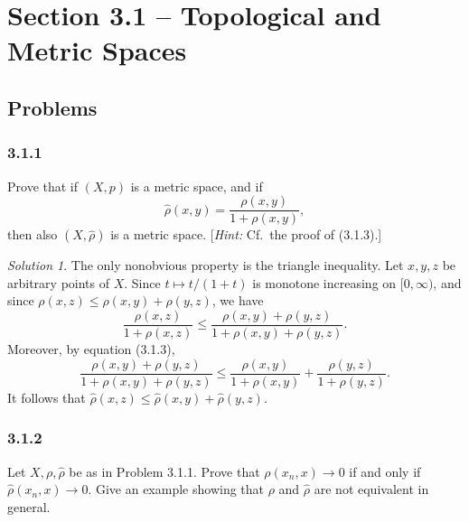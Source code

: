 \documentclass{report}
\theoremstyle{remark}
\newtheorem*{solution}{Solution}
\begin{document}
\section*{Section 3.1 -- Topological and Metric Spaces}

\subsection*{Problems}

\subsubsection*{3.1.1}
Prove that if $(X,p)$ is a metric space, and if
\begin{equation*}
  \hat \rho(x,y) = \frac{\rho(x,y)}{1 + \rho(x,y)},
\end{equation*}
then also $(X,\hat \rho)$ is a metric space. [\emph{Hint:} Cf.\ the proof of (3.1.3).]

\begin{solution}
  The only nonobvious property is the triangle inequality. Let $x,y,z$ be arbitrary points of $X$. Since $t \mapsto t/(1+t)$ is monotone increasing on $[0,\infty)$, and since $\rho(x,z) \le \rho(x,y) + \rho(y,z)$, we have
  \begin{equation*}
    \frac{\rho(x,z)}{1 + \rho(x,z)} \le \frac{\rho(x,y) + \rho(y,z)}{1 + \rho(x,y) + \rho(y,z)}.
  \end{equation*}
  Moreover, by equation (3.1.3),
  \begin{equation*}
    \frac{\rho(x,y) + \rho(y,z)}{1 + \rho(x,y) + \rho(y,z)} \le \frac{\rho(x,y)}{1 + \rho(x,y)} + \frac{\rho(y,z)}{1 + \rho(y,z)}.
  \end{equation*}
  It follows that $\hat \rho(x,z) \le \hat \rho(x,y) + \hat \rho(y,z)$.
\end{solution}

\subsubsection*{3.1.2}
Let $X, \rho, \hat \rho$ be as in Problem 3.1.1. Prove that $\rho(x_n, x) \to 0$ if and only if $\hat \rho(x_n, x) \to 0$. Give an example showing that $\rho$ and $\hat \rho$ are not equivalent in general.
\end{document}

